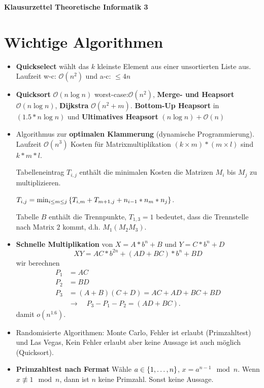 \documentclass[landscape, 8pt, a4paper]{extarticle}
\newcommand{\simpleset}[1]{\ensuremath\left\{ #1 \right\}}
\renewcommand{\O}{\mathcal O}
\begin{document}
\begin{multicols}{3}
\raggedbottom
	\textbf{Klausurzettel Theoretische Informatik 3}

	\section{Wichtige Algorithmen}
	\begin{itemize}
		\item \textbf{Quickselect} wählt das $k$ kleinste Element aus einer unsortierten Liste aus. Laufzeit w-c: $\O(n^2)$ und a-c: $\leq4n$
		\item \textbf{Quicksort} $\O(n\log n)$ worst-case:$\O(n^2)$, \textbf{Merge- und Heapsort} $\O(n\log n)$, \textbf{Dijkstra} $\O(n^2+m)$. \textbf{Bottom-Up Heapsort} in $(1.5*n\log n)$ und \textbf{Ultimatives Heapsort} $(n\log n) + \O(n)$

		\item Algorithmus zur \textbf{optimalen Klammerung} (dynamische Programmierung). Laufzeit $\O(n^3)$
		Kosten für Matrixmultiplikation $(k\times m)*(m\times l)$ sind $k*m*l$.

		Tabelleneintrag $T_{i,j}$ enthält die minimalen Kosten die Matrizen $M_i$ bis $M_j$ zu multiplizieren.

		$T_{i,j}=\min_{i\leq m\leq j}\simpleset{T_{i,m}+T_{m+1,j}+n_{i-1}*n_{m}*n_{j}}$.

		Tabelle $B$ enthält die Trennpunkte, $T_{1,3}=1$ bedeutet, dass die Trennstelle nach Matrix $2$ kommt, d.h. $M_1(M_2M_3)$.

		\item \textbf{Schnelle Multiplikation} von $X=A*b^n+B$ und $Y=C*b^n+D$
		\begin{equation*}
			XY=AC*b^{2n}+(AD+BC)*b^n+BD
		\end{equation*}
		wir berechnen
		\begin{align*}
			P_1&=AC\\
			P_2&=BD\\
			P_3&=(A+B)(C+D)=AC+AD+BC+BD\\
			&\rightarrow \quad P_3-P_1-P_2=(AD+BC).
		\end{align*}
		damit $o(n^{1.6})$.

		\item Randomisierte Algorithmen: Monte Carlo, Fehler ist erlaubt (Primzahltest) und Las Vegas, Kein Fehler erlaubt aber keine Aussage ist auch möglich (Quicksort). 

		\item \textbf{Primzahltest nach Fermat} Wähle $a\in\simpleset{1,\ldots,n}$, $x=a^{n-1}\mod n$. Wenn $x\not\equiv 1\mod n$, dann ist $n$ keine Primzahl. Sonst keine Aussage.


\end{itemize}
\end{multicols}
\end{document}
